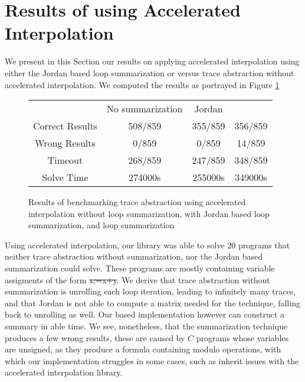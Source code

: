 \section{Results of using Accelerated Interpolation}
We present in this Section our results on applying accelerated interpolation using either the Jordan based loop summarization or \qvasr versus trace abstraction without accelerated interpolation. We computed the results as portrayed in Figure \ref{table_acc}
\begin{figure}[H]
	\centering
		\begin{tabular}{cccc}
			\toprule
			& No summarization & Jordan & \qvasr \\
			\cmidrule{1-4}
			Correct Results & 508/859 & 355/859 & 356/859\\
			Wrong Results & 0/859 & 0/859 & 14/859\\
			Timeout & 268/859 & 247/859 & 348/859 \\
			Solve Time &  274000s & 255000s & 349000s
		\end{tabular}
	\caption{Results of benchmarking trace abstraction using accelerated interpolation without loop summarization, with Jordan based loop summarization, and \qvasr loop summarization}
	\label{table_acc}
\end{figure}
Using accelerated interpolation, our \qvasr library was able to solve 20 programs that neither trace abstraction without summarization, nor the Jordan based summarization could solve. These programs are mostly containing variable assigments of the form \st{x:=x+y}. We derive that trace abstraction without summarization is unrolling each loop iteration, leading to infinitely many traces, and that Jordan is not able to compute a matrix needed for the technique, falling back to unrolling as well. Our \qvasr based implementation however can construct a summary in able time. We see, nonetheless, that the \qvasr summarization technique produces a few wrong results, these are caused by $C$ programs whose variables are unsigned, as they produce a formula containing modulo operations, with which our \qvasr implementation struggles in some cases, such as inherit issues with the accelerated interpolation library.

